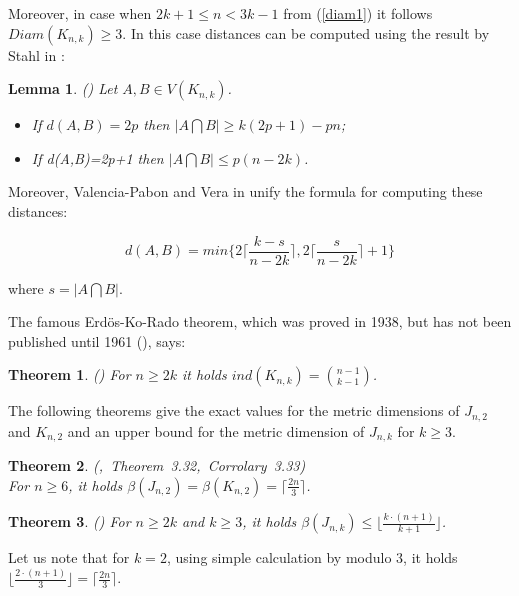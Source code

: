 \documentclass[preprint,12pt]{elsarticle}
\newtheorem{lem}{Lemma}
\newtheorem{thm}{Theorem}
\begin{document}
Moreover, in case when $2k+1 \le n < 3k-1$ from (\ref{diam1}) it follows $Diam(K_{n,k}) \ge 3$.
In this case distances can be computed using the result by Stahl in \cite{sta76}:

\begin{lem} \label{sta} \mbox{\rm(\cite{sta76})} Let $A,B \in V(K_{n,k})$.
\begin{itemize}
\item[(i)] If $d(A,B)=2p$ then $|A \bigcap B| \ge k(2p+1)-pn$;
\item[(ii)] If d(A,B)=2p+1 then $|A \bigcap B| \le p(n-2k)$.
\end{itemize}
\end{lem}

Moreover, Valencia-Pabon and Vera in \cite{pab05} unify the formula for computing these distances:

\begin{equation} \label{dkn} 
d(A,B) = min \{2 \lceil \frac{k-s}{n-2k} \rceil, 2 \lceil \frac{s}{n-2k} \rceil+1 \}
\end{equation}

where $s = |A \bigcap B|$.

The famous Erd\"os-Ko-Rado theorem, which was proved in 1938, but has not been published until 1961
(\cite{erd61}), says:

\begin{thm} \label{erd} \mbox{\rm(\cite{erd61})} For $n \ge 2k$ it holds $ind(K_{n,k}) = \binom{n-1}{k-1}$.
 \end{thm}

The following theorems give the exact values for the metric dimensions of $J_{n,2}$ and $K_{n,2}$
and an upper bound for the metric dimension of $J_{n,k}$ for $k \ge 3$.

\begin{thm} \label{mjk} \mbox{\rm(\cite{metdj1}, Theorem 3.32, Corrolary 3.33)} \\
For $n \ge 6$, it holds $\beta(J_{n,2}) = \beta(K_{n,2}) = \lceil \frac{2n}{3} \rceil$.
 \end{thm}

\begin{thm} \label{mjk1} \mbox{\rm(\cite{metdj2})} For $n \ge 2k$ and $k \ge 3$, it holds $\beta(J_{n,k}) \le \lfloor \frac{k \cdot (n+1)}{k+1} \rfloor$.
 \end{thm} 

Let us note that for $k=2$, using simple calculation by modulo 3, it holds $\lfloor \frac{2 \cdot (n+1)}{3} \rfloor = \lceil \frac{2n}{3} \rceil$.
\end{document}
